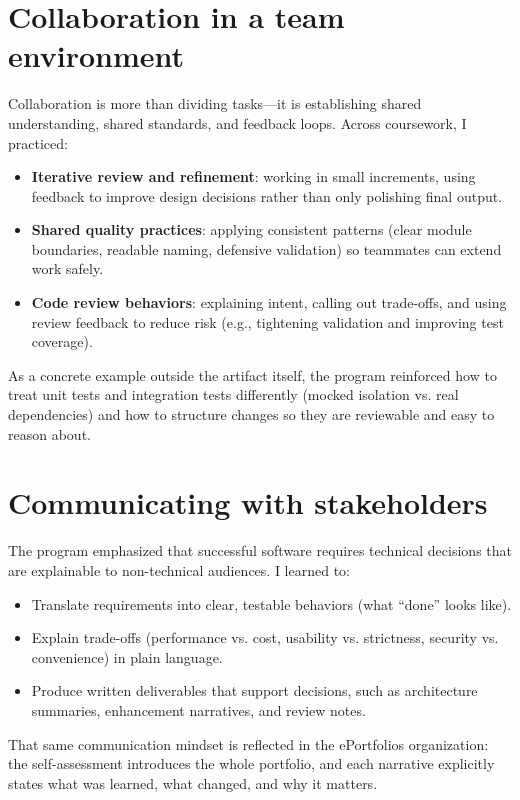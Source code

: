 \documentclass[12pt,stu]{apa7}
\begin{document}
\section*{Collaboration in a team environment}

Collaboration is more than dividing tasks---it is establishing shared understanding, shared standards, and feedback loops. Across coursework, I practiced:

\begin{itemize}
  \item \textbf{Iterative review and refinement}: working in small increments, using feedback to improve design decisions rather than only polishing final output.
  \item \textbf{Shared quality practices}: applying consistent patterns (clear module boundaries, readable naming, defensive validation) so teammates can extend work safely.
  \item \textbf{Code review behaviors}: explaining intent, calling out trade-offs, and using review feedback to reduce risk (e.g., tightening validation and improving test coverage).
\end{itemize}

As a concrete example outside the artifact itself, the program reinforced how to treat unit tests and integration tests differently (mocked isolation vs. real dependencies) and how to structure changes so they are reviewable and easy to reason about.

\section*{Communicating with stakeholders}

The program emphasized that successful software requires technical decisions that are explainable to non-technical audiences. I learned to:

\begin{itemize}
  \item Translate requirements into clear, testable behaviors (what \enquote{done} looks like).
  \item Explain trade-offs (performance vs. cost, usability vs. strictness, security vs. convenience) in plain language.
  \item Produce written deliverables that support decisions, such as architecture summaries, enhancement narratives, and review notes.
\end{itemize}

That same communication mindset is reflected in the ePortfolio\textquotesingle s organization: the self-assessment introduces the whole portfolio, and each narrative explicitly states what was learned, what changed, and why it matters.
\end{document}
